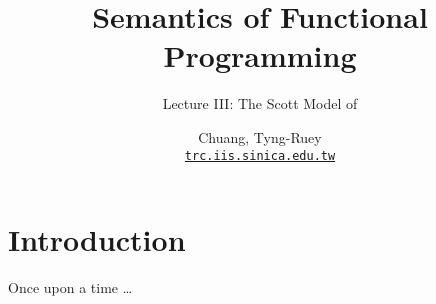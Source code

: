 \title{Semantics of Functional Programming}
\subtitle{Lecture III: The Scott Model of \PCF}
\author[T.-R. Chuang]{Chuang, Tyng-Ruey \\
  \href{mailto@trc.iis.sinica.edu.tw}{\texttt{trc.iis.sinica.edu.tw}}}

\frame{\maketitle}
\section{Introduction}  
\begin{frame}
  Once upon a time \dots 
\end{frame}

